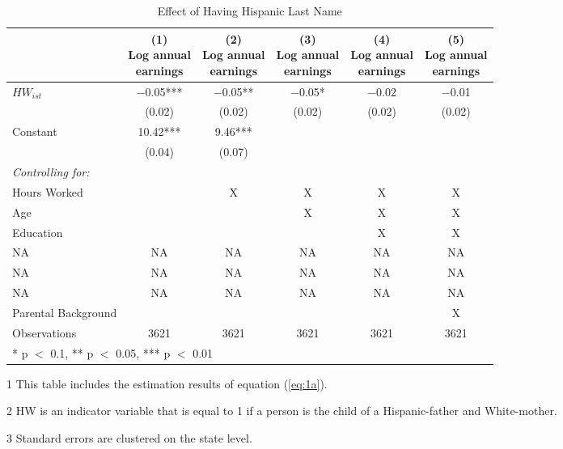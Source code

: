 \begin{table}[H]
\centering\centering
\caption{Effect of Having Hispanic Last Name \label{tab:lastnamereg}}
\centering
\begin{threeparttable}
\begin{tabular}[t]{lccccc}
\toprule
  & \specialcell{(1) \\ Log annual \\ earnings} & \specialcell{(2) \\ Log annual \\ earnings} & \specialcell{(3) \\ Log annual \\ earnings} & \specialcell{(4) \\  Log annual \\ earnings} & \specialcell{(5) \\  Log annual \\ earnings}\\
\midrule
$HW_{ist}$ & \num{-0.05}*** & \num{-0.05}** & \num{-0.05}* & \num{-0.02} & \num{-0.01}\\
 & (\num{0.02}) & (\num{0.02}) & (\num{0.02}) & (\num{0.02}) & (\num{0.02})\\
Constant & \num{10.42}*** & \num{9.46}*** &  &  & \\
 & (\num{0.04}) & (\num{0.07}) &  &  & \\
\midrule
\textit{Controlling for:} &  &  &  &  & \\
Hours Worked &  & X & X & X & X\\
Age &  &  & X & X & X\\
Education &  &  &  & X & X\\
NA & NA & NA & NA & NA & \vphantom{2} NA\\
NA & NA & NA & NA & NA & \vphantom{1} NA\\
NA & NA & NA & NA & NA & NA\\
Parental Background &  &  &  &  & X\\
Observations & \num{3621} & \num{3621} & \num{3621} & \num{3621} & \num{3621}\\
\bottomrule
\multicolumn{6}{l}{\rule{0pt}{1em}* p $<$ 0.1, ** p $<$ 0.05, *** p $<$ 0.01}\\
\end{tabular}
\begin{tablenotes}
\item[1] {\footnotesize{This table includes the estimation results of equation (\ref{eq:1a}).}}
\item[2] {\footnotesize{HW is an indicator variable that is equal to 1 if a person is the child of a Hispanic-father and White-mother.}}
\item[3] {\footnotesize{Standard errors are clustered on the state level.}}
\end{tablenotes}
\end{threeparttable}
\end{table}
